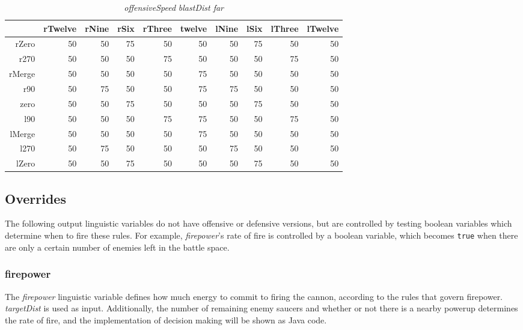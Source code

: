 \begin{table}[H]
\centering
\caption{\emph{offensiveSpeed} \emph{blastDist far}}
\label{Turn rule table}
\begin{tabular}{r|r|r|r|r|r|r|r|r|r}
 		& rTwelve 	& rNine 	& rSix 		& rThree 		& twelve 	& lNine 	& lSix 		& lThree	& lTwelve		\\ \hline
rZero	& 50		& 50		& 75		& 50 		 	& 50		& 50		& 75 		& 50		& 50			\\
r270	& 50		& 50		& 50		& 75			& 50		& 50		& 50		& 75		& 50			\\
rMerge	& 50		& 50		& 50	 	& 50			& 75		& 50		& 50		& 50		& 50			\\
r90		& 50		& 75		& 50 		& 50			& 75		& 75		& 50		& 50		& 50			\\
zero 	& 50		& 50 		& 75 		& 50			& 50		& 50		& 75		& 50		& 50			\\
l90 	& 50		& 50 		& 50		& 75			& 75		& 50		& 50		& 75		& 50			\\
lMerge	& 50		& 50 		& 50	 	& 50			& 75		& 50		& 50		& 50		& 50			\\
l270 	& 50		& 75	 	& 50 		& 50			& 50		& 75		& 50		& 50		& 50			\\
lZero 	& 50		& 50 		& 75	 	& 50			& 50		& 50  		& 75		& 50		& 50			
\end{tabular}
\end{table}

\subsection{Overrides}

The following output linguistic variables do not have offensive or defensive versions, but are controlled by testing boolean variables which determine when to fire these rules. For example, \emph{firepower}'s rate of fire is controlled by a boolean variable, which becomes \texttt{true} when there are only a certain number of enemies left in the battle space.

\subsubsection{firepower}

The \emph{firepower} linguistic variable defines how much energy to commit to firing the cannon, according to the rules that govern firepower. \emph{targetDist} is used as input. Additionally, the number of remaining enemy saucers and whether or not there is a nearby powerup determines the rate of fire, and the implementation of decision making will be shown as Java code.

